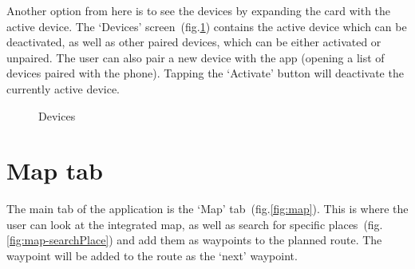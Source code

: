 Another option from here is to see the devices by expanding the card with the active device.
The `Devices' screen~(fig.\ref{fig:devices}) contains the active device which can be deactivated, as well as other paired devices, which can be either activated or unpaired.
The user can also pair a new device with the app (opening a list of devices paired with the phone).
Tapping the `Activate' button will deactivate the currently active device.

\begin{figure}[h!]
    \centering
    \hfill
    \caption{Devices}
    \label{fig:devices}
\end{figure}

\section{Map tab}
The main tab of the application is the `Map' tab~(fig.\ref{fig:map}).
This is where the user can look at the integrated map, as well as search for specific places~(fig.\ref{fig:map-searchPlace}) and add them as waypoints to the planned route.
The waypoint will be added to the route as the `next' waypoint.

